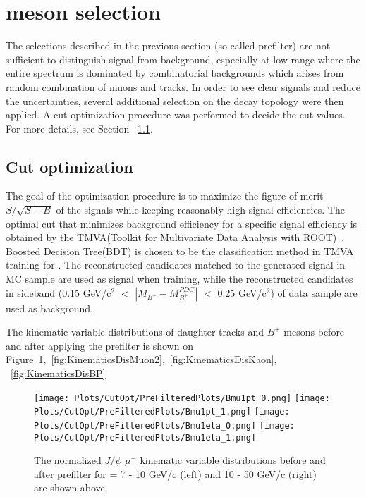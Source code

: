 \section {\Bplus meson selection}
\label{sec:Bsel}
The selections described in the previous section (so-called prefilter) are not sufficient to distinguish signal from background, especially at low \pt range where the entire spectrum is dominated by combinatorial backgrounds which arises from random combination of muons and tracks. In order to see clear signals and reduce the uncertainties, several additional selection on the \Bplus decay topology were then applied.
A cut optimization procedure was performed to decide the cut values. For more details, see Section ~\ref{sec:CutOpt}.

\subsection{Cut optimization}
\label{sec:CutOpt}
The goal of the optimization procedure is to maximize the figure of merit $S/\sqrt{S+B}$ of the signals while keeping reasonably high signal efficiencies. The optimal cut that minimizes background efficiency for a specific signal efficiency is obtained by the TMVA(Toolkit for Multivariate Data Analysis with ROOT)~\cite{Hocker:2007ht}. \\
Boosted Decision Tree(BDT) is chosen to be the classification method in TMVA training for \Bplus. The reconstructed candidates matched to the generated signal in MC sample are used as signal when training, while the reconstructed candidates in sideband (0.15 GeV/c$^2$ $<$ $|M_{B^{+}}-M_{B^{+}}^{PDG}|$ $<$ 0.25 GeV/c$^2$) of data sample are used as background.

The kinematic variable distributions of daughter tracks and $B^+$ mesons before and after applying the prefilter is shown on Figure~\ref{fig:KinematicsDisMuon1},~\ref{fig:KinematicsDisMuon2},~\ref{fig:KinematicsDisKaon}, ~\ref{fig:KinematicsDisBP}

\clearpage


\begin{figure}[h]
\begin{center}
\texttt{[image: Plots/CutOpt/PreFilteredPlots/Bmu1pt\_0.png]}
\texttt{[image: Plots/CutOpt/PreFilteredPlots/Bmu1pt\_1.png]}
\texttt{[image: Plots/CutOpt/PreFilteredPlots/Bmu1eta\_0.png]}
\texttt{[image: Plots/CutOpt/PreFilteredPlots/Bmu1eta\_1.png]}
\caption{The normalized $J/\psi$ $\mu^-$ kinematic variable distributions before and after prefilter for \pt = 7 - 10 GeV/c (left) and 10 - 50 GeV/c (right) are shown above.}
\label{fig:KinematicsDisMuon1}
\end{center}
\end{figure}


